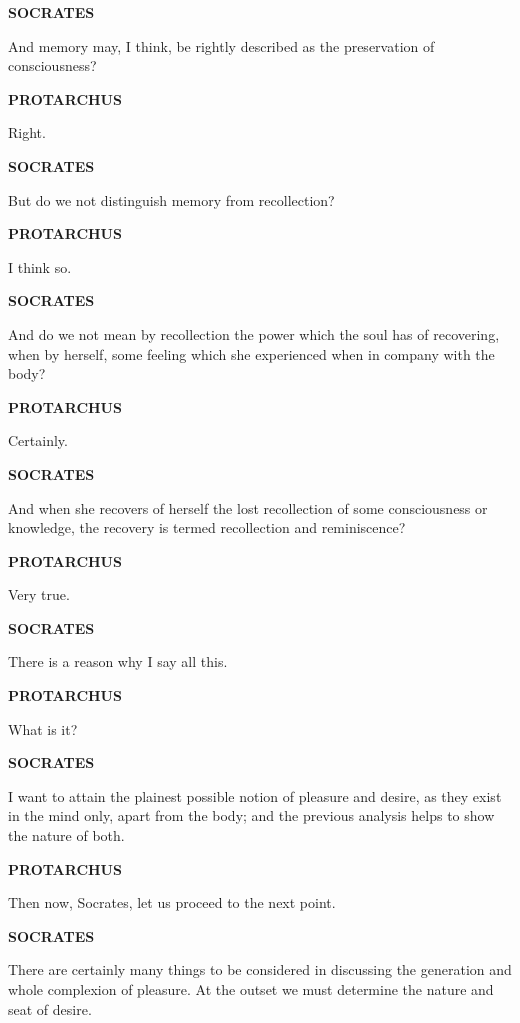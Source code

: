 \documentclass[11pt,letter]{article}
\begin{document}
\par \textbf{SOCRATES}
\par   And memory may, I think, be rightly described as the preservation of consciousness?

\par \textbf{PROTARCHUS}
\par   Right.

\par \textbf{SOCRATES}
\par   But do we not distinguish memory from recollection?

\par \textbf{PROTARCHUS}
\par   I think so.

\par \textbf{SOCRATES}
\par   And do we not mean by recollection the power which the soul has of recovering, when by herself, some feeling which she experienced when in company with the body?

\par \textbf{PROTARCHUS}
\par   Certainly.

\par \textbf{SOCRATES}
\par   And when she recovers of herself the lost recollection of some consciousness or knowledge, the recovery is termed recollection and reminiscence?

\par \textbf{PROTARCHUS}
\par   Very true.

\par \textbf{SOCRATES}
\par   There is a reason why I say all this.

\par \textbf{PROTARCHUS}
\par   What is it?

\par \textbf{SOCRATES}
\par   I want to attain the plainest possible notion of pleasure and desire, as they exist in the mind only, apart from the body; and the previous analysis helps to show the nature of both.

\par \textbf{PROTARCHUS}
\par   Then now, Socrates, let us proceed to the next point.

\par \textbf{SOCRATES}
\par   There are certainly many things to be considered in discussing the generation and whole complexion of pleasure. At the outset we must determine the nature and seat of desire.
\end{document}
